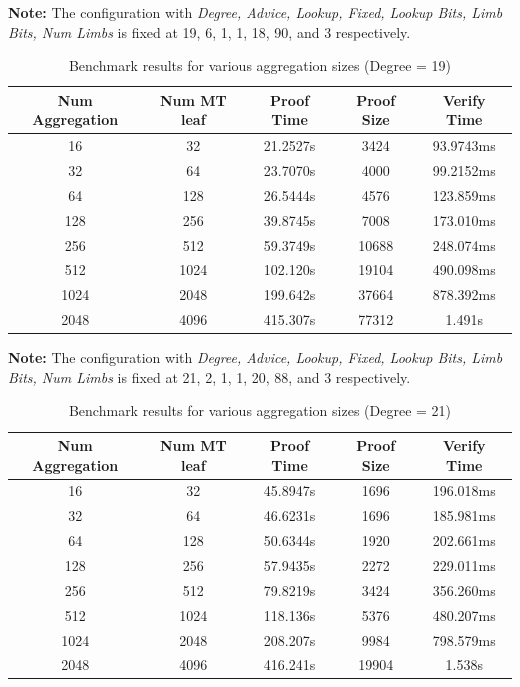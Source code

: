 \documentclass{article}
\begin{document}
\textbf{Note:} The configuration with \textit{Degree, Advice, Lookup, Fixed, Lookup Bits, Limb Bits, Num Limbs} is fixed at 19, 6, 1, 1, 18, 90, and 3 respectively.

\begin{table}[h]
    \centering
    \begin{tabular}{c|c|c|c|c} \hline
        Num Aggregation & Num MT leaf & Proof Time & Proof Size & Verify Time \\ \hline
        16 & 32 & 21.2527s & 3424 & 93.9743ms \\ \hline
        32 & 64 & 23.7070s & 4000 & 99.2152ms \\ \hline
        64 & 128 & 26.5444s & 4576 & 123.859ms \\ \hline
        128 & 256 & 39.8745s & 7008 & 173.010ms \\ \hline
        256 & 512 & 59.3749s & 10688 & 248.074ms \\ \hline
        512 & 1024 & 102.120s & 19104 & 490.098ms \\ \hline
        1024 & 2048 & 199.642s & 37664 & 878.392ms \\ \hline
        2048 & 4096 & 415.307s & 77312 & 1.491s \\ \hline
    \end{tabular}
    \caption{Benchmark results for various aggregation sizes (Degree = 19)}
    \label{tab:degree19}
\end{table}

\textbf{Note:} The configuration with \textit{Degree, Advice, Lookup, Fixed, Lookup Bits, Limb Bits, Num Limbs} is fixed at 21, 2, 1, 1, 20, 88, and 3 respectively.

\begin{table}[h]
    \centering
    \begin{tabular}{c|c|c|c|c} \hline
        Num Aggregation & Num MT leaf & Proof Time & Proof Size & Verify Time \\ \hline
        16 & 32 & 45.8947s & 1696 & 196.018ms \\ \hline
        32 & 64 & 46.6231s & 1696 & 185.981ms \\ \hline
        64 & 128 & 50.6344s & 1920 & 202.661ms \\ \hline
        128 & 256 & 57.9435s & 2272 & 229.011ms \\ \hline
        256 & 512 & 79.8219s & 3424 & 356.260ms \\ \hline
        512 & 1024 & 118.136s & 5376 & 480.207ms \\ \hline
        1024 & 2048 & 208.207s & 9984 & 798.579ms \\ \hline
        2048 & 4096 & 416.241s & 19904 & 1.538s \\ \hline
    \end{tabular}
    \caption{Benchmark results for various aggregation sizes (Degree = 21)}
    \label{tab:degree21}
\end{table}
\end{document}
